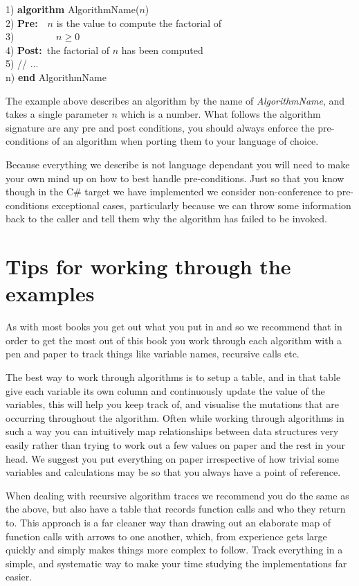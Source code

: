 \begin{tabbing}
1)  \textbf{alg}\= \textbf{orithm} AlgorithmName($n$) \\
2)  \> \textbf{Pre:}~~$n$ is the value to compute the factorial of \\
3)  \> ~~~~~~~~$n \geq 0$ \\
4)  \> \textbf{Post:}~the factorial of $n$ has been computed \\
5)  \> // ... \\
n) \textbf{end} AlgorithmName \\
\end{tabbing}

The example above describes an algorithm by the name of \textit{AlgorithmName}, and takes a single parameter $n$ which is a number. What follows the algorithm signature are any pre and post conditions, you should always enforce the pre-conditions of an algorithm when porting them to your language of choice.

Because everything we describe is not language dependant you will need to make your own mind up on how to best handle pre-conditions. Just so that you know though in the C\# target we have implemented we consider non-conference to pre-conditions exceptional cases, particularly because we can throw some information back to the caller and tell them why the algorithm has failed to be invoked. 

\section{Tips for working through the examples}
As with most books you get out what you put in and so we recommend that in order to get the most out of this book you work through each algorithm with a pen and paper to track things like variable names, recursive calls etc.

The best way to work through algorithms is to setup a table, and in that table give each variable its own column and continuously update the value of the variables, this will help you keep track of, and visualise the mutations that are occurring throughout the algorithm. Often while working through algorithms in such a way you can intuitively map relationships between data structures very easily rather than trying to work out a few values on paper and the rest in your head. We suggest you put everything on paper irrespective of how trivial some variables and calculations may be so that you always have a point of reference.

When dealing with recursive algorithm traces we recommend you do the same as the above, but also have a table that records function calls and who they return to. This approach is a far cleaner way than drawing out an elaborate map of function calls with arrows to one another, which, from experience gets large quickly and simply makes things more complex to follow. Track everything in a simple, and systematic way to make your time studying the implementations far easier.

